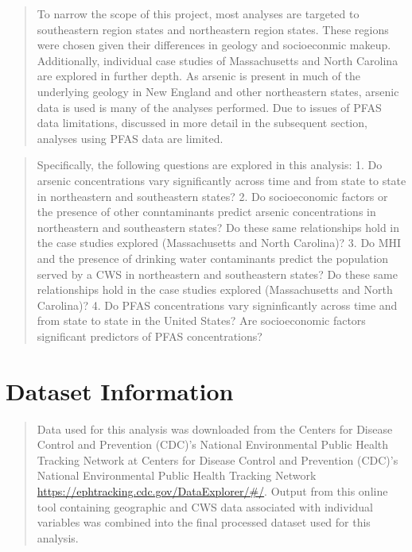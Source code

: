 \documentclass[12pt,]{article}
\begin{document}
\begin{quote}
To narrow the scope of this project, most analyses are targeted to
southeastern region states and northeastern region states. These regions
were chosen given their differences in geology and socioeconmic makeup.
Additionally, individual case studies of Massachusetts and North
Carolina are explored in further depth. As arsenic is present in much of
the underlying geology in New England and other northeastern states,
arsenic data is used is many of the analyses performed. Due to issues of
PFAS data limitations, discussed in more detail in the subsequent
section, analyses using PFAS data are limited.
\end{quote}

\begin{quote}
Specifically, the following questions are explored in this analysis: 1.
Do arsenic concentrations vary significantly across time and from state
to state in northeastern and southeastern states? 2. Do socioeconomic
factors or the presence of other conntaminants predict arsenic
concentrations in northeastern and southeastern states? Do these same
relationships hold in the case studies explored (Massachusetts and North
Carolina)? 3. Do MHI and the presence of drinking water contaminants
predict the population served by a CWS in northeastern and southeastern
states? Do these same relationships hold in the case studies explored
(Massachusetts and North Carolina)? 4. Do PFAS concentrations vary
signinficantly across time and from state to state in the United States?
Are socioeconomic factors significant predictors of PFAS concentrations?
\end{quote}

\newpage

\hypertarget{dataset-information}{%
\section{Dataset Information}\label{dataset-information}}

\begin{quote}
Data used for this analysis was downloaded from the Centers for Disease
Control and Prevention (CDC)'s National Environmental Public Health
Tracking Network at Centers for Disease Control and Prevention (CDC)'s
National Environmental Public Health Tracking Network
\url{https://ephtracking.cdc.gov/DataExplorer/\#/}. Output from this
online tool containing geographic and CWS data associated with
individual variables was combined into the final processed dataset used
for this analysis.
\end{quote}
\end{document}
